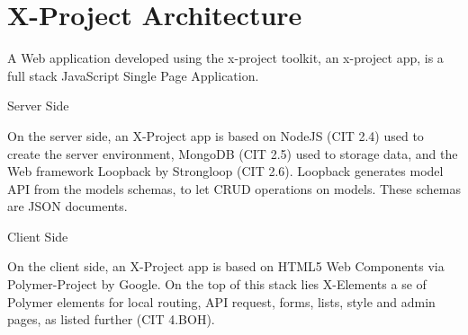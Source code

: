 \section{X-Project Architecture}
\label{sec:XPR_arc}

A Web application developed using the x-project toolkit, an x-project app, is a full stack JavaScript Single Page Application.

Server Side

On the server side, an X-Project app is based on NodeJS (CIT 2.4) used to create the server environment, MongoDB (CIT 2.5) used to storage data, and the Web framework Loopback by Strongloop (CIT 2.6).
Loopback generates model API from the models schemas, to let CRUD operations on models. These schemas are JSON documents.

Client Side

On the client side, an X-Project app is based on HTML5 Web Components via Polymer-Project by Google.
On the top of this stack lies X-Elements a se of Polymer elements for local routing, API request, forms, lists, style and admin pages, as listed further (CIT 4.BOH).